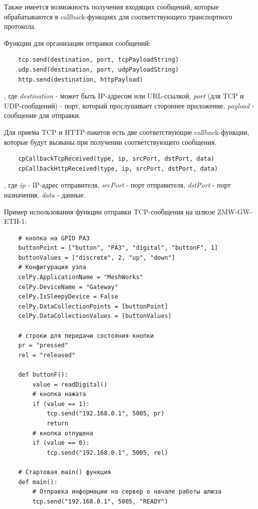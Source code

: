 \documentclass[12pt]{article}
\begin{document}
Также имеется возможность получения входящих сообщений, которые обрабатываются в
callback-функциях для соответствующего транспортного протокола.

Функции для организации отправки сообщений:
    \begin{verbatim}
    tcp.send(destination, port, tcpPayloadString)
    udp.send(destination, port, udpPayloadString)
    http.send(destination, httpPayload)
    \end{verbatim}

, где \emph{destination} - может быть IP-адресом или URL-ссылкой, \emph{port} 
(для TCP и UDP-сообщений) - порт, который прослушивает стороннее приложение, 
\emph{payload} - сообщение для отправки.

Для приема TCP и HTTP-пакетов есть две соответствующие callback-функции, которые
будут вызваны при получении соответствующего сообщения.
    \begin{verbatim}
    cpCallbackTcpReceived(type, ip, srcPort, dstPort, data)
    cpCallbackHttpReceived(type, ip, srcPort, dstPort, data)
    \end{verbatim}
    
, где \emph{ip} - IP-адрес отправителя, \emph{srcPort} - порт отправителя, 
\emph{dstPort} - порт назначения, \emph{data} - данные.

Пример использования функции отправки TCP-сообщения на шлюзе ZMW-GW-ETH-1:
    \begin{verbatim}
    # кнопка на GPIO PA3 
    buttonPoint = ["button", "PA3", "digital", "buttonF", 1]
    buttonValues = ["discrete", 2, "up", "down"]
    # Конфигурация узла
    celPy.ApplicationName = "MeshWorks"   
    celPy.DeviceName = "Gateway"
    celPy.IsSleepyDevice = False
    celPy.DataCollectionPoints = [buttonPoint]  
    celPy.DataCollectionValues = [buttonValues] 
    
    # строки для передачи состояния кнопки
    pr = "pressed"
    rel = "released"

    def buttonF():
        value = readDigital()
        # кнопка нажата
        if (value == 1):
            tcp.send("192.168.0.1", 5005, pr)
            return
        # кнопка отпущена
        if (value == 0):
            tcp.send("192.168.0.1", 5005, rel)

    # Стартовая main() функция   
    def main(): 
        # Отправка информации на сервер о начале работы шлюза
        tcp.send("192.168.0.1", 5005, "READY")
    \end{verbatim}
\end{document}
